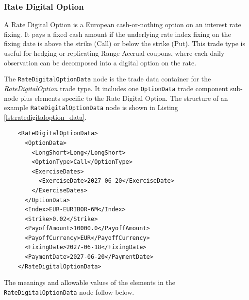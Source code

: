 \subsubsection{Rate Digital Option}

A Rate Digital Option is a European cash-or-nothing option on an interest rate fixing. It pays a fixed cash amount if the
underlying rate index fixing on the fixing date is above the strike (Call) or below the strike (Put). This trade type is
useful for hedging or replicating Range Accrual coupons, where each daily observation can be decomposed into a digital
option on the rate.

The \lstinline!RateDigitalOptionData! node is the trade data container for the \emph{RateDigitalOption} trade type. It
includes one \lstinline!OptionData! trade component sub-node plus elements specific to the Rate Digital Option. The
structure of an example \lstinline!RateDigitalOptionData! node is shown in Listing
\ref{lst:ratedigitaloption_data}.

\begin{listing}[H]
\begin{verbatim}
    <RateDigitalOptionData>
      <OptionData>
        <LongShort>Long</LongShort>
        <OptionType>Call</OptionType>
        <ExerciseDates>
          <ExerciseDate>2027-06-20</ExerciseDate>
        </ExerciseDates>
      </OptionData>
      <Index>EUR-EURIBOR-6M</Index>
      <Strike>0.02</Strike>
      <PayoffAmount>10000.0</PayoffAmount>
      <PayoffCurrency>EUR</PayoffCurrency>
      <FixingDate>2027-06-18</FixingDate>
      <PaymentDate>2027-06-20</PaymentDate>
    </RateDigitalOptionData>
\end{verbatim}
\caption{Rate Digital Option data}
\label{lst:ratedigitaloption_data}
\end{listing}

The meanings and allowable values of the elements in the \lstinline!RateDigitalOptionData! node follow below.

